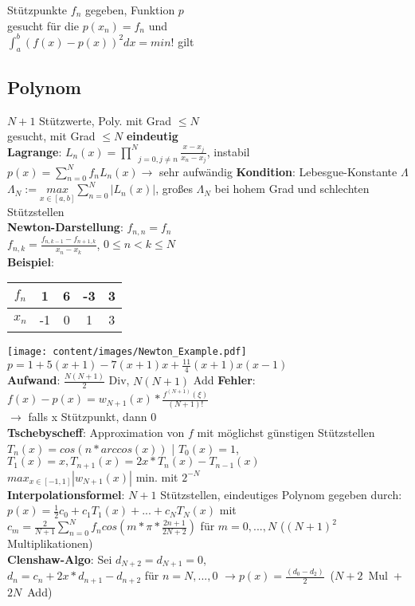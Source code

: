 Stützpunkte $f_n$ gegeben, Funktion $p$\\ gesucht für die $p(x_n) = f_n$ und\\
$\int_a^b (f(x) - p(x))^2dx = min!$ gilt\\
\subsection{Polynom}
$N + 1$ Stützwerte, Poly. mit Grad $\leq N$ \\gesucht,
mit Grad $\leq N$ \textbf{eindeutig}\\
\textbf{Lagrange}: 
$L_n(x) = \underset{j = 0, j \neq n}{\prod^N}\frac{x-x_j}{x_n - x_j} $, instabil\\
$p(x) = \sum_{n=0}^N f_nL_n(x) \rightarrow$ sehr aufwändig
\textbf{Kondition}: Lebesgue-Konstante $\Lambda$\\
$\Lambda_N := \underset{x \in [a,b]}{max}\sum_{n=0}^N |L_n(x)|$,
großes $\Lambda_N$ bei hohem Grad und schlechten Stützstellen\\
\textbf{Newton-Darstellung}: $f_{n,n} = f_n$\\
$f_{n,k} = \frac{f_{n,k - 1} - f_{n + 1,k}}{x_n - x_k}$, $0 \leq n < k \leq N$\\

\textbf{Beispiel}:
\begin{tabular}{ c|c|c|c|c } 
 $f_n$ & 1 & 6 & -3 & 3\\ 
 \hline
 $x_n$ & -1 & 0 & 1 & 3\\ 
\end{tabular}
\texttt{[image: content/images/Newton\_Example.pdf]}\\
$p = 1 + 5(x + 1)- 7(x + 1)x + \frac{11}{4}(x+1)x(x-1)$\\
\textbf{Aufwand}: $\frac{N(N + 1)}{2}$ Div, $N(N + 1)$ Add
\textbf{Fehler}: $f(x) - p(x) = w_{N+1}(x)*\frac{f^{(N+1)}(\xi)}{(N+1)!}$\\
$\rightarrow$ falls x Stützpunkt, dann 0\\
\textbf{Tschebyscheff}: Approximation von $f$ mit möglichst günstigen Stützstellen\\
$T_n(x) = cos(n*arccos(x))$ | $T_0(x) = 1$, $T_1(x) = x, T_{n+1}(x) = 2x * T_n(x) - T_{n-1}(x)$\\
$max_{x \in [-1, 1]}|w_{N+1}(x)|$ min. mit $2^{-N}$\\
\newpage
\textbf{Interpolationsformel}: $N + 1$ Stützstellen, eindeutiges Polynom gegeben durch:\\
$p(x) = \frac{1}{2}c_0 + c_1T_1(x) + ... + c_NT_N(x)$ mit
$c_m = \frac{2}{N + 1}\sum_{n=0}^N f_n cos(m * \pi * \frac{2n + 1}{2N + 2})$ für $m = 0,...,N$ ($(N + 1)^2$ Multiplikationen)\\
\textbf{Clenshaw-Algo}: Sei $d_{N+2} = d_{N+1} = 0$,\\
$d_n = c_n + 2x * d_{n+1} - d_{n+2}$ für $n = N, ...,0$
\mbox{$\rightarrow p(x) = \frac{(d_0 - d_2)}{2}$ ($N + 2$ Mul + $2N$ Add)}
